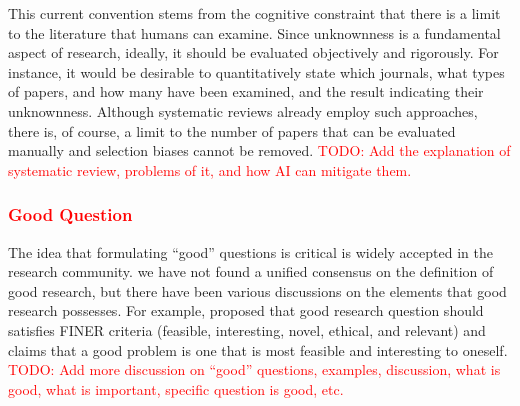 \documentclass{book}
\begin{document}

This current convention stems from the cognitive constraint that there is a limit to the literature that humans can examine. Since unknownness is a fundamental aspect of research, ideally, it should be evaluated objectively and rigorously. For instance, it would be desirable to quantitatively state which journals, what types of papers, and how many have been examined, and the result indicating their unknownness. Although systematic reviews already employ such approaches, there is, of course, a limit to the number of papers that can be evaluated manually and selection biases cannot be removed. \textcolor{red}{TODO: Add the explanation of systematic review, problems of it, and how AI can mitigate them.}

\subsubsection{\textcolor{red}{Good Question}}

The idea that formulating ``good'' questions is critical is widely accepted in the research community. we have not found a unified consensus on the definition of good research, but there have been various discussions on the elements that good research possesses. For example, \cite{hulley2007designing} proposed that good research question should satisfies FINER criteria (feasible, interesting, novel, ethical, and relevant) and \cite{alon2009choose} claims that a good problem is one that is most feasible and interesting to oneself. \textcolor{red}{TODO: Add more discussion on ``good'' questions, examples, discussion, what is good, what is important, specific question is good, etc.}


\end{document}
